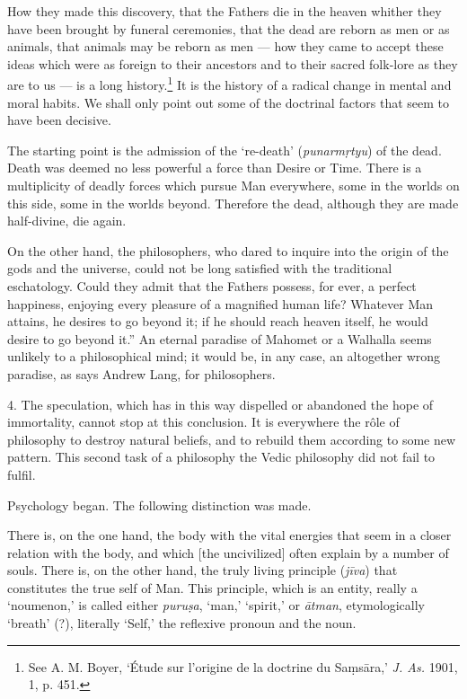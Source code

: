 \documentclass[a4paper, 11pt, oneside, english]{article}
\begin{document}
How they made this discovery, that the Fathers die in the heaven whither they have been brought by funeral ceremonies, that the dead are reborn as men or as animals, that animals may be reborn as men --- how they came to accept these ideas which were as foreign to their ancestors and to their sacred folk-lore as they are to us --- is a long history.\footnote{See A. M. Boyer, `Étude sur l'origine de la doctrine du Saṃsāra,' \emph{J. As.} 1901, 1, p. 451.} It is the history of a radical change in mental and moral habits. We shall only point out some of the doctrinal factors that seem to have been decisive.

The starting point is the admission of the `re-death' (\emph{punarmṛtyu}) of the dead. Death was deemed no less powerful a force than Desire or Time. There is a multiplicity of deadly forces which pursue Man everywhere, some in the worlds on this side, some in the worlds beyond. Therefore the dead, although they are made half-divine, die again.

On the other hand, the philosophers, who dared to inquire into the origin of the gods and the universe, could not be long satisfied with the traditional eschatology. Could they admit that the Fathers possess, for ever, a perfect happiness, enjoying every pleasure of a magnified human life? Whatever Man attains, he desires to go beyond it; if he should reach heaven itself, he would desire to go beyond it.'' An eternal paradise of Mahomet or a Walhalla seems unlikely to a philosophical mind; it would be, in any case, an altogether wrong paradise, as says Andrew Lang, for philosophers.

4. The speculation, which has in this way dispelled or abandoned the hope of immortality, cannot stop at this conclusion. It is everywhere the rôle of philosophy to destroy natural beliefs, and to rebuild them according to some new pattern. This second task of a philosophy the Vedic philosophy did not fail to fulfil.

Psychology began. The following distinction was made.

There is, on the one hand, the body with the vital energies that seem in a closer relation with the body, and which [the uncivilized] often explain by a number of souls. There is, on the other hand, the truly living principle (\emph{jīva}) that constitutes the true self of Man. This principle, which is an entity, really a `noumenon,' is called either \emph{puruṣa}, `man,' `spirit,' or \emph{ātman}, etymologically `breath' (?), literally `Self,' the reflexive pronoun and the noun.
\end{document}
